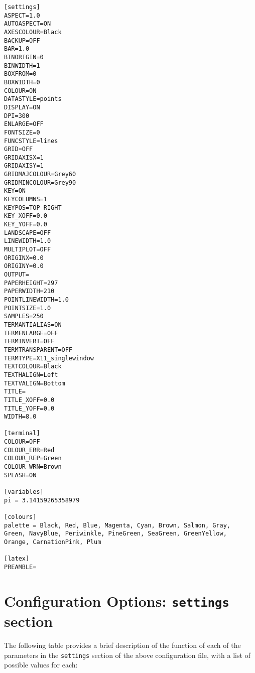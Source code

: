 \begin{verbatim}
[settings]
ASPECT=1.0
AUTOASPECT=ON
AXESCOLOUR=Black
BACKUP=OFF
BAR=1.0
BINORIGIN=0
BINWIDTH=1
BOXFROM=0
BOXWIDTH=0
COLOUR=ON
DATASTYLE=points
DISPLAY=ON
DPI=300
ENLARGE=OFF
FONTSIZE=0
FUNCSTYLE=lines
GRID=OFF
GRIDAXISX=1
GRIDAXISY=1
GRIDMAJCOLOUR=Grey60
GRIDMINCOLOUR=Grey90
KEY=ON
KEYCOLUMNS=1
KEYPOS=TOP RIGHT
KEY_XOFF=0.0
KEY_YOFF=0.0
LANDSCAPE=OFF
LINEWIDTH=1.0
MULTIPLOT=OFF
ORIGINX=0.0
ORIGINY=0.0
OUTPUT=
PAPERHEIGHT=297
PAPERWIDTH=210
POINTLINEWIDTH=1.0
POINTSIZE=1.0 
SAMPLES=250
TERMANTIALIAS=ON
TERMENLARGE=OFF
TERMINVERT=OFF
TERMTRANSPARENT=OFF
TERMTYPE=X11_singlewindow
TEXTCOLOUR=Black
TEXTHALIGN=Left
TEXTVALIGN=Bottom
TITLE=
TITLE_XOFF=0.0
TITLE_YOFF=0.0
WIDTH=8.0

[terminal]
COLOUR=OFF
COLOUR_ERR=Red
COLOUR_REP=Green
COLOUR_WRN=Brown
SPLASH=ON

[variables]
pi = 3.14159265358979

[colours]
palette = Black, Red, Blue, Magenta, Cyan, Brown, Salmon, Gray,
Green, NavyBlue, Periwinkle, PineGreen, SeaGreen, GreenYellow,
Orange, CarnationPink, Plum

[latex]
PREAMBLE=
\end{verbatim}

\section{Configuration Options: {\tt settings} section}
\label{sec:configfile_settings}

The following table provides a brief description of the function of each of the
parameters in the {\tt settings} section of the above configuration file,
with a list of possible values for each:

